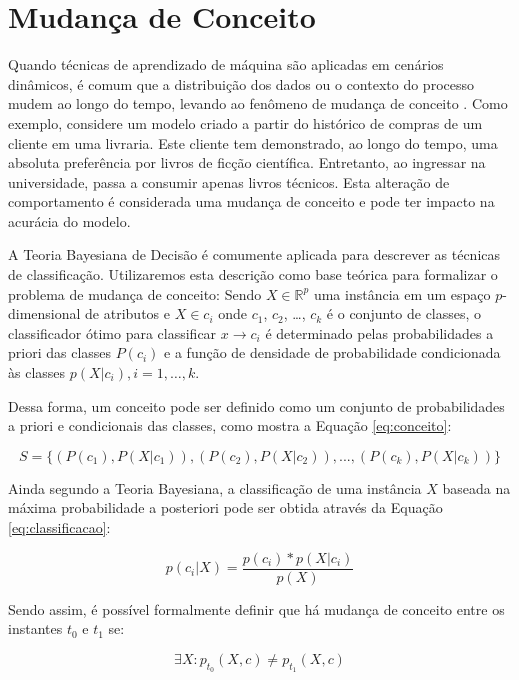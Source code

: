 \documentclass[qual, classic, a4paper]{ufbathesis}
\begin{document}
\section{Mudança de Conceito}

Quando técnicas de aprendizado de máquina são aplicadas em cenários dinâmicos, é comum que a distribuição dos dados ou o contexto do processo mudem ao longo do tempo, levando ao fenômeno de mudança de conceito \cite{Schlimmer1986}.
Como exemplo, considere um modelo criado a partir do histórico de compras de um cliente em uma livraria.
Este cliente tem demonstrado, ao longo do tempo, uma absoluta preferência por livros de ficção científica.
Entretanto, ao ingressar na universidade, passa a consumir apenas livros técnicos.
Esta alteração de comportamento é considerada uma mudança de conceito e pode ter impacto na acurácia do modelo.

A Teoria Bayesiana de Decisão \cite{Duda:2000:PC:954544} é comumente aplicada para descrever as técnicas de classificação.
Utilizaremos esta descrição como base teórica para formalizar o problema de mudança de conceito:
Sendo $X \in \mathbb{R}^p$ uma instância em um espaço $p$-dimensional de atributos e $X \in c_i$ onde $c_1$, $c_2$, \ldots, $c_k$ é o conjunto de classes, 
o classificador ótimo para classificar $x \rightarrow c_i$ é determinado pelas probabilidades a priori das classes $P(c_i)$ e a função de densidade de probabilidade condicionada às classes $p(X|c_i), i = 1, \ldots, k$.

Dessa forma, um conceito pode ser definido como um conjunto de probabilidades a priori e condicionais das classes, como mostra a Equação \ref{eq:conceito}:

\begin{equation} \label{eq:conceito}
    S = \{(P(c_1), P(X|c_1)), (P(c_2), P(X|c_2)), ..., (P(c_k), P(X|c_k))\}
\end{equation}

Ainda segundo a Teoria Bayesiana, a classificação de uma instância $X$ baseada na máxima probabilidade a posteriori pode ser obtida através da Equação \ref{eq:classificacao}:

\begin{equation} \label{eq:classificacao}
    p(c_i|X) = \frac{p(c_i) * p(X|c_i)}{p(X)}
\end{equation}

Sendo assim, é possível formalmente definir que há mudança de conceito entre os instantes $t_0$ e $t_1$ se:

\begin{equation} \label{eq:3}
    {\exists}X : p_{t_0}(X, c) \ne p_{t_1}(X, c)
\end{equation}
\end{document}
